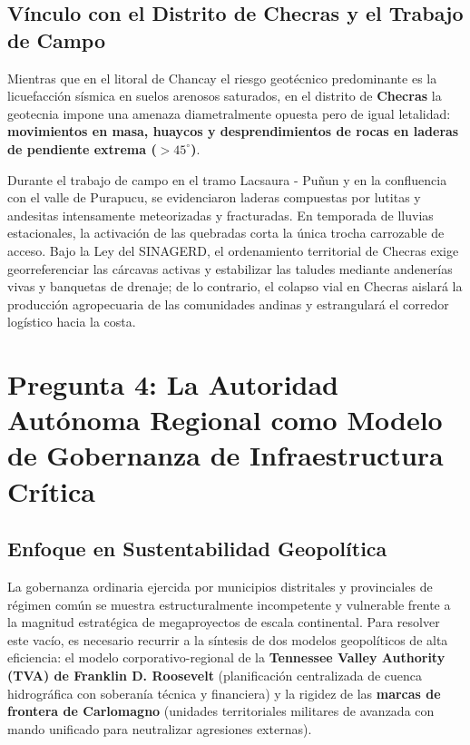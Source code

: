 \documentclass[11pt,a4paper]{article}
\begin{document}
\subsection{Vínculo con el Distrito de Checras y el Trabajo de Campo}
Mientras que en el litoral de Chancay el riesgo geotécnico predominante es la licuefacción sísmica en suelos arenosos saturados, en el distrito de \textbf{Checras} la geotecnia impone una amenaza diametralmente opuesta pero de igual letalidad: \textbf{movimientos en masa, huaycos y desprendimientos de rocas en laderas de pendiente extrema ($> 45^\circ$)}.

Durante el trabajo de campo en el tramo Lacsaura - Puñun y en la confluencia con el valle de Purapucu, se evidenciaron laderas compuestas por lutitas y andesitas intensamente meteorizadas y fracturadas. En temporada de lluvias estacionales, la activación de las quebradas corta la única trocha carrozable de acceso. Bajo la Ley del SINAGERD, el ordenamiento territorial de Checras exige georreferenciar las cárcavas activas y estabilizar las taludes mediante andenerías vivas y banquetas de drenaje; de lo contrario, el colapso vial en Checras aislará la producción agropecuaria de las comunidades andinas y estrangulará el corredor logístico hacia la costa.


\newpage

\section{Pregunta 4: La Autoridad Autónoma Regional como Modelo de Gobernanza de Infraestructura Crítica}

\subsection{Enfoque en Sustentabilidad Geopolítica}
La gobernanza ordinaria ejercida por municipios distritales y provinciales de régimen común se muestra estructuralmente incompetente y vulnerable frente a la magnitud estratégica de megaproyectos de escala continental. Para resolver este vacío, es necesario recurrir a la síntesis de dos modelos geopolíticos de alta eficiencia: el modelo corporativo-regional de la \textbf{Tennessee Valley Authority (TVA) de Franklin D. Roosevelt} (planificación centralizada de cuenca hidrográfica con soberanía técnica y financiera) y la rigidez de las \textbf{marcas de frontera de Carlomagno} (unidades territoriales militares de avanzada con mando unificado para neutralizar agresiones externas).
\end{document}

